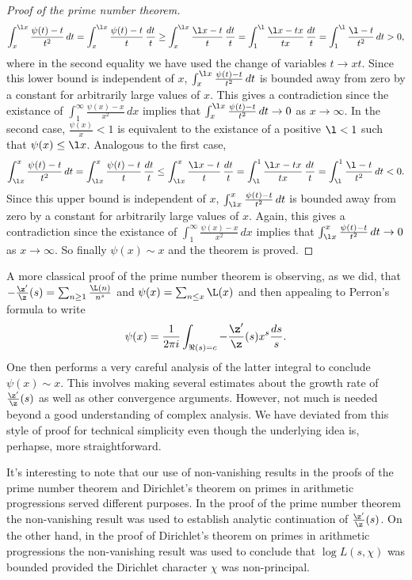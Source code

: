 \begin{proof}[Proof of the prime number theorem]
        \[
          \int_{x}^{\l x}\frac{\psi(t)-t}{t^{2}}\,dt = \int_{x}^{\l x}\frac{\psi(t)-t}{t}\,\frac{dt}{t} \ge \int_{x}^{\l x}\frac{\l x-t}{t}\,\frac{dt}{t} = \int_{1}^{\l}\frac{\l x-tx}{tx}\,\frac{dt}{t} = \int_{1}^{\l}\frac{\l-t}{t^{2}}\,dt > 0,
        \]
        where in the second equality we have used the change of variables $t \to xt$. Since this lower bound is independent of $x$, $\int_{x}^{\l x}\frac{\psi(t)-t}{t^{2}}\,dt$ is bounded away from zero by a constant for arbitrarily large values of $x$. This gives a contradiction since the existance of $\int_{1}^{\infty}\frac{\psi(x)-x}{x^{2}}\,dx$ implies that $\int_{x}^{\l x}\frac{\psi(t)-t}{t^{2}}\,dt \to 0$ as $x \to \infty$. In the second case, $\frac{\psi(x)}{x} < 1$ is equivalent to the existance of a positive $\l < 1$ such that $\psi(x) \le \l x$. Analogous to the first case,
        \[
          \int_{\l x}^{x}\frac{\psi(t)-t}{t^{2}}\,dt = \int_{\l x}^{x}\frac{\psi(t)-t}{t}\,\frac{dt}{t} \le \int_{\l x}^{x}\frac{\l x-t}{t}\,\frac{dt}{t} = \int_{\l}^{1}\frac{\l x-tx}{tx}\,\frac{dt}{t} = \int_{\l}^{1}\frac{\l-t}{t^{2}}\,dt < 0.
        \]
        Since this upper bound is independent of $x$, $\int_{\l x}^{x}\frac{\psi(t)-t}{t^{2}}\,dt$ is bounded away from zero by a constant for arbitrarily large values of $x$. Again, this gives a contradiction since the existance of $\int_{1}^{\infty}\frac{\psi(x)-x}{x^{2}}\,dx$ implies that $\int_{\l x}^{x}\frac{\psi(t)-t}{t^{2}}\,dt \to 0$ as $x \to \infty$. So finally $\psi(x) \sim x$ and the theorem is proved.
      \end{proof}

      A more classical proof of the prime number theorem is observing, as we did, that $-\frac{\z'}{\z}(s) = \sum_{n \ge 1}\frac{\L(n)}{n^{s}}$ and $\psi(x) = \sum_{n \le x}\L(x)$ and then appealing to Perron's formula to write
      \[
        \psi(x) = \frac{1}{2\pi i}\int_{\Re(s) = c}-\frac{\z'}{\z}(s)x^{s}\frac{ds}{s}.
      \]
      One then performs a very careful analysis of the latter integral to conclude $\psi(x) \sim x$. This involves making several estimates about the growth rate of $\frac{\z'}{\z}(s)$ as well as other convergence arguments. However, not much is needed beyond a good understanding of complex analysis. We have deviated from this style of proof for technical simplicity even though the underlying idea is, perhapse, more straightforward.

      \begin{remark}
        It's interesting to note that our use of non-vanishing results in the proofs of the prime number theorem and Dirichlet's theorem on primes in arithmetic progressions served different purposes. In the proof of the prime number theorem the non-vanishing result was used to establish analytic continuation of $\frac{\z'}{\z}(s)$. On the other hand, in the proof of Dirichlet's theorem on primes in arithmetic progressions the non-vanishing result was used to conclude that $\log L(s,\chi)$ was bounded provided the Dirichlet character $\chi$ was non-principal.
      \end{remark}

